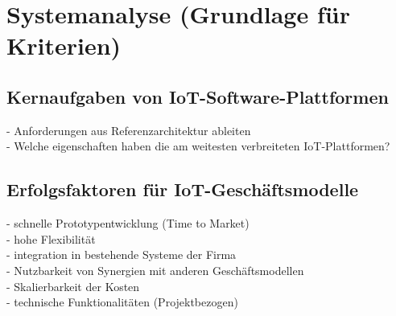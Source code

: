 \chapter{Systemanalyse (Grundlage für Kriterien)}\label{ch:Systemanalyse (Grundlage für Kriterien)}
\section{Kernaufgaben von IoT-Software-Plattformen}\label{sec:Kernaufgaben von IoT-Software-Plattformen}
- Anforderungen aus Referenzarchitektur ableiten\\
- Welche eigenschaften haben die am weitesten verbreiteten IoT-Plattformen?\\
\section{Erfolgsfaktoren für IoT-Geschäftsmodelle}\label{sec:Erfolgsfaktoren für IoT-Geschäftsmodelle}
- schnelle Prototypentwicklung (Time to Market)\\
- hohe Flexibilität\\
- integration in bestehende Systeme der Firma\\
- Nutzbarkeit von Synergien mit anderen Geschäftsmodellen\\
- Skalierbarkeit der Kosten\\
- technische Funktionalitäten (Projektbezogen)\\
